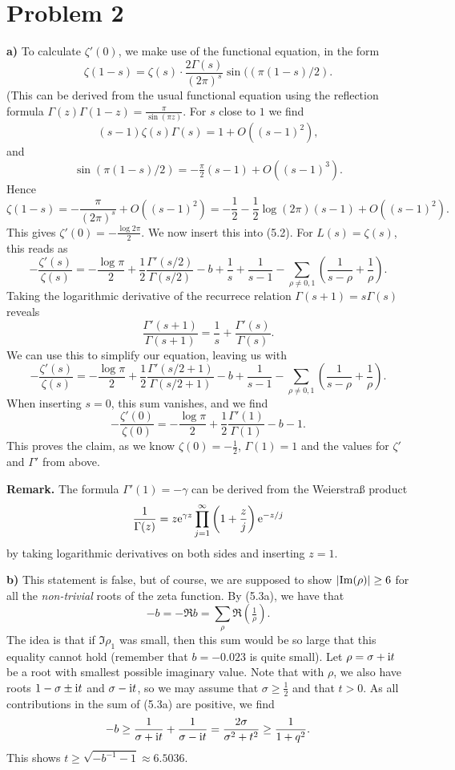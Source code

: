 \documentclass[a4paper,11pt]{article}
\begin{document}
\section*{Problem 2}
\textbf{a)}
To calculate $\zeta'(0)$, we make use of the functional equation, in the
form
\[
    \zeta(1-s) = \zeta(s) \cdot \frac{2\Gamma(s)}{(2\pi)^s} 
    \sin((\pi(1-s)/2).
\]
(This can be derived from the usual functional equation using the reflection formula
$\Gamma(z) \Gamma(1-z) = \frac \pi{\sin(\pi z)}$. For $s$ close to $1$ we find
\[
    (s-1)\zeta(s) \Gamma(s) = 1 + O((s-1)^2),
\]
and 
\[
    \sin(\pi(1-s)/2) = -\tfrac \pi 2 (s-1) + O((s-1)^3).
\]
Hence
\[
    \zeta(1-s) = - \frac{\pi}{(2\pi)^s} + O((s-1)^2) = 
    - \frac 12 - \frac 12 \log(2\pi) (s-1) + O((s-1)^2). 
\]
This gives $\zeta'(0) = - \frac{\log 2 \pi}2$.
We now insert this into (5.2). For $L(s) = \zeta(s)$, this reads as
\[
    - \frac{\zeta'(s)}{\zeta(s)} = - \frac{\log \pi}2 + \frac 12 \frac{\Gamma'(s/2)}
    {\Gamma(s/2)} - b + \frac 1s + \frac{1}{s-1} - \sum_{\rho \neq 0,1} 
    \left( \frac{1}{s-\rho} + \frac 1 \rho\right).
\]
Taking the logarithmic derivative of the recurrece relation $\Gamma(s+1) = s \Gamma(s)$ reveals
\[
    \frac{\Gamma'(s+1)}{\Gamma(s+1)} = \frac 1s + \frac{\Gamma'(s)}{\Gamma(s)}.
\]
We can use this to simplify our equation, leaving us with
\[
    -\frac{\zeta'(s)}{\zeta(s)} = -\frac{\log \pi}2 + \frac 12 \frac{\Gamma'(s/2+1)}{\Gamma(s/2 + 1)} - b + \frac {1}{s-1} - \sum_{\rho \neq 0,1} \left( \frac1{s-\rho} 
        + \frac 1 \rho \right ).
\]
When inserting $s=0$, this sum vanishes, and we find
\[
    -\frac{\zeta'(0)}{\zeta(0)} = -\frac{\log \pi}{2} + \frac 12 \frac{\Gamma'(1)}{\Gamma(1)} - b - 1.
\]
This proves the claim, as we know $\zeta(0) = - \frac 12$, $\Gamma(1) = 1$ 
and the values for $\zeta'$ and $\Gamma'$ from above. 

\textbf{Remark.} The formula $\Gamma'(1) = -\gamma$ can be derived from
the Weierstraß product
\[
\frac 1 {\Gamma(z)} = z \mathrm e^{\gamma z} \prod_{j=1}^\infty\left(1+ \frac zj
\right) \mathrm e^{-z/j}
\]
by taking logarithmic derivatives on both sides and inserting $z=1$.

\textbf{b)} This statement is false, but of course, we are supposed to show 
$\left\lvert \operatorname{Im}(\rho)  \right\rvert \geq 6$ for all the \textit{non-trivial} roots of the zeta
function.
By (5.3a), we have that $$-b = -\Re b = \sum_\rho \Re(\tfrac 1 \rho).$$
The idea is that if $\Im \rho_1$ was small, then this sum would be so large that
this equality cannot hold (remember that $b = -0.023$ is quite small).
Let $\rho = \sigma + \mathrm i t$ be a root with smallest possible imaginary value.
Note that with $\rho$, we also have roots $1-\sigma \pm \mathrm i t$ and $\sigma - \mathrm i t$,
so we may assume that $\sigma \geq \frac 12$ and that $t > 0$. As all
contributions in the sum of (5.3a) are positive, we find
\[
    -b \geq \frac 1{\sigma + \mathrm i t} + \frac1{\sigma - \mathrm i t} =
    \frac{2 \sigma}{\sigma^2 + t^2} \geq \frac 1{1+q^2}.
\]
This shows $t \geq \sqrt{-b^{-1}-1} \approx 6.5036$. 
\end{document}
